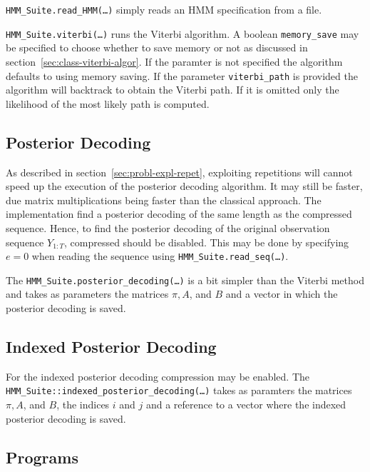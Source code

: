 \texttt{HMM\_Suite.read\_HMM(\dots)} simply reads an HMM specification from a
file.

\texttt{HMM\_Suite.viterbi(\dots)} runs the Viterbi algorithm. A boolean
\texttt{memory\_save} may be specified to choose whether to save memory or not
as discussed in section~\ref{sec:class-viterbi-algor}. If the paramter is not
specified the algorithm defaults to using memory saving. If the parameter
\texttt{viterbi\_path} is provided the algorithm will backtrack to obtain the
Viterbi path. If it is omitted only the likelihood of the most likely path is
computed.

\subsection{Posterior Decoding}

As described in section~\ref{sec:probl-expl-repet}, exploiting repetitions will
cannot speed up the execution of the posterior decoding algorithm. It may still
be faster, due matrix multiplications being faster than the classical
approach. The implementation find a posterior decoding of the same length as
the compressed sequence. Hence, to find the posterior decoding of the original
observation sequence $Y_{1:T}$, compressed should be disabled. This may be done by
specifying $e = 0$ when reading the sequence using
\texttt{HMM\_Suite.read\_seq(\dots)}.

The \texttt{HMM\_Suite.posterior\_decoding(\dots)} is a bit simpler than the
Viterbi method and takes as parameters the matrices $\pi, A$, and $B$ and a
vector in which the posterior decoding is saved.

\subsection{Indexed Posterior Decoding}

For the indexed posterior decoding compression may be enabled. The
\texttt{HMM\_Suite::indexed\_posterior\_decoding(\dots)} takes as paramters the
matrices $\pi, A$, and $B$, the indices $i$ and $j$ and a reference to a vector
where the indexed posterior decoding is saved.

\subsection{Programs}



